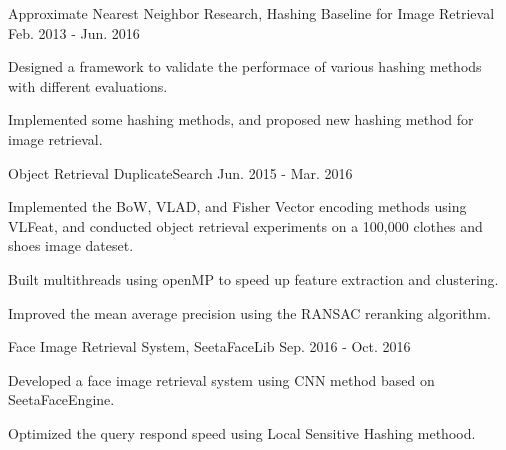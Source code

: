 \begin{cventries}
  \cventry
    {Approximate Nearest Neighbor Research, \href{https://github.com/willard-yuan/hashing-baseline-for-image-retrieval}{\color{blue}{Code}}} %
    {Hashing Baseline for Image Retrieval} %
    {} %
    {Feb. 2013 - Jun. 2016} %
    {
      \begin{cvitems} %
        \item {Designed a framework to validate the performace of various hashing methods with different evaluations.}
        \item {Implemented some hashing methods, and proposed new hashing method for image retrieval.}
      \end{cvitems}
    }

  \cventry
    {Object Retrieval} %
    {DuplicateSearch} %
    {} %
    {Jun. 2015 - Mar. 2016} %
    {
      \begin{cvitems} %
        \item {Implemented the BoW, VLAD, and Fisher Vector encoding methods using VLFeat, and conducted object retrieval experiments on a 100,000 clothes and shoes image dateset.}
        \item {Built multithreads using openMP to speed up feature extraction and clustering.}
        \item {Improved the mean average precision using the RANSAC reranking algorithm.}
      \end{cvitems}
    }

  \cventry
    {Face Image Retrieval System, \href{https://github.com/willard-yuan/SeetaFaceLib}{\color{blue}{Code}}} %
    {SeetaFaceLib} %
    {} %
    {Sep. 2016 - Oct. 2016} %
    {
      \begin{cvitems} %
        \item {Developed a face image retrieval system using CNN method based on SeetaFaceEngine.}
        \item {Optimized the query respond speed using Local Sensitive Hashing methood.}
      \end{cvitems}
    }

\end{cventries}
